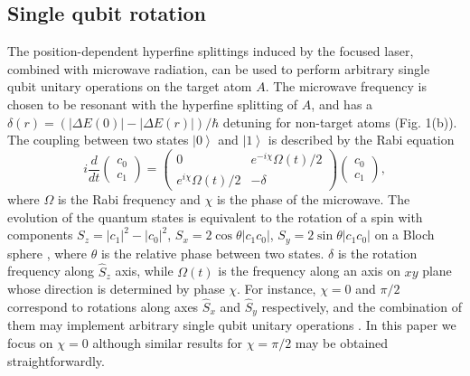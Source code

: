 \documentclass[pra,aps,showpacs,twocolumn]{revtex4}
\begin{document}
\subsection{Single qubit rotation}

The position-dependent hyperfine splittings induced by the focused laser,
combined with microwave radiation, can be used to perform arbitrary single
qubit unitary operations on the target atom $A$. The microwave frequency is
chosen to be resonant with the hyperfine splitting of $A$, and has a $\delta
\left( r\right) =\left( \left\vert \Delta E\left( 0\right) \right\vert
-\left\vert \Delta E\left( r\right) \right\vert \right) /\hbar $ detuning
for non-target atoms (Fig. 1(b)). The coupling between two states $%
\left\vert 0\right\rangle $ and $\left\vert 1\right\rangle $ is described by
the Rabi equation%
\begin{equation}
i\frac{d}{dt}\left( 
\begin{array}{c}
c_{0} \\ 
c_{1}%
\end{array}%
\right) =\left( 
\begin{array}{cc}
0 & e^{-i\chi }\Omega \left( t\right) /2 \\ 
e^{i\chi }\Omega \left( t\right) /2 & -\delta%
\end{array}%
\right) \left( 
\begin{array}{c}
c_{0} \\ 
c_{1}%
\end{array}%
\right) ,  \label{rabieq}
\end{equation}%
where $\Omega $ is the Rabi frequency and $\chi $ is the phase of the
microwave. The evolution of the quantum states is equivalent to the rotation
of a spin with components $S_{z}=\left\vert c_{1}\right\vert ^{2}-\left\vert
c_{0}\right\vert ^{2}$, $S_{x}=2\cos \theta \left\vert c_{1}c_{0}\right\vert 
$, $S_{y}=2\sin \theta \left\vert c_{1}c_{0}\right\vert $ on a Bloch sphere 
\cite{Metcalf}, where $\theta $ is the relative phase between two states. $%
\delta $ is the rotation frequency along $\hat{S}_{z}$ axis, while $\Omega
\left( t\right) $ is the frequency along an axis on $xy$ plane whose
direction is determined by phase $\chi $. For instance, $\chi =0$ and $\pi
/2 $ correspond to rotations along axes $\hat{S}_{x}$ and $\hat{S}_{y}$
respectively, and the combination of them may implement arbitrary single
qubit unitary operations \cite{Nielsen}. In this paper we focus on $\chi =0$
although similar results for $\chi =\pi /2$ may be obtained
straightforwardly.
\end{document}
